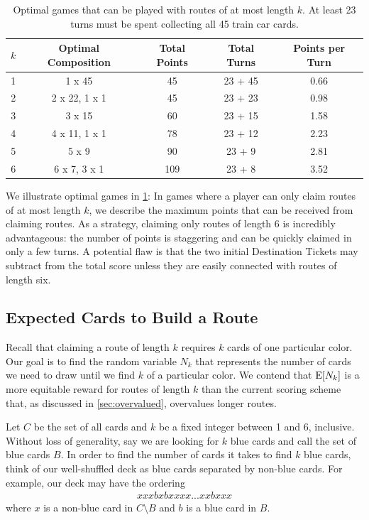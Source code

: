 \begin{table}[H]
    \renewcommand{\arraystretch}{1.5}
    \begin{tabular}{| c | c | c | c | c |}
    \hline
    $k$ & Optimal Composition & Total Points & Total Turns & 
    Points per Turn\\
    \hline
    1 & 1 x 45 & 45 & 23 + 45 & 0.66\\
    \hline
    2 & 2 x 22, 1 x 1 & 45 & 23 + 23 & 0.98\\
    \hline
    3 & 3 x 15 & 60 & 23 + 15 & 1.58\\
    \hline
    4 & 4 x 11, 1 x 1 & 78 & 23 + 12 & 2.23\\
    \hline
    5 & 5 x 9 & 90 & 23 + 9 & 2.81\\
    \hline
    6 & 6 x 7, 3 x 1 & 109 & 23 + 8 & 3.52\\
    \hline
    \end{tabular}
    \vspace{.5cm}
    \caption{Optimal games that can be played with
    routes of at most length $k$. At least 
    23 turns must be spent collecting all
    45 train car cards.}
    \vspace{-.75cm}
    \label{table:k_games}
\end{table}

We illustrate optimal games in \cref{table:k_games}:
In games where a player can only claim routes of 
at most length $k$, we describe the maximum points
that can be received from claiming routes.
As a strategy, claiming only routes of length 6 is
incredibly advantageous: the number of points is staggering
and can be quickly claimed in only a few turns.
A potential flaw is that the two initial Destination Tickets
may subtract from the total score unless they are easily
connected with routes of length six.

\subsection{Expected Cards to Build a
Route}
\label{sec:collecting_cards}
Recall that claiming a route of length $k$ requires
$k$ cards of one particular color.
Our goal is to find the random variable $N_k$ that
represents the number of cards we need to draw
until we find $k$ of a particular color.
We contend that $\operatorname{\mathrm{E}}[N_k]$ is a more equitable reward for routes
of length $k$ than the current scoring scheme that,
as discussed in \cref{sec:overvalued},
overvalues longer routes.

Let $C$ be the set of all cards and $k$ be a fixed integer
between 1 and 6, inclusive.
Without loss of generality, say we are looking
for $k$ blue cards and call the set of blue cards $B$.
In order to find the number of cards it takes 
to find $k$ blue cards,
think of our well-shuffled deck as
blue cards separated by non-blue cards.
For example, our deck may have the ordering
\begin{align}
    xxxbxbxxxx...xxbxxx \nonumber
\end{align}
where $x$ is a non-blue card in $C \setminus B$
and $b$ is a blue card in $B$.


